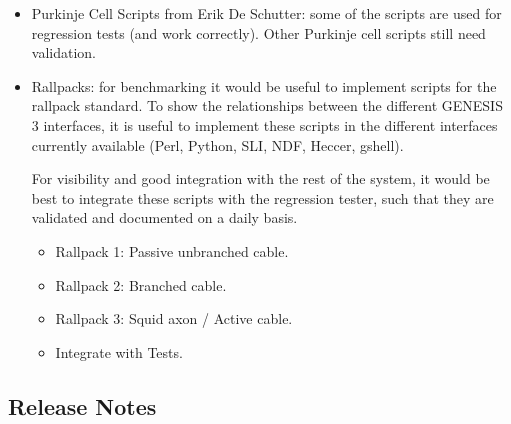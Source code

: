 \documentclass[12pt]{article}
\begin{document}
\begin{itemize}
\item Purkinje Cell Scripts from Erik De Schutter: some of the scripts
  are used for regression tests (and work correctly).  Other Purkinje
  cell scripts still need validation.
\item Rallpacks: for benchmarking it would be useful to implement
  scripts for the rallpack standard.  To show the relationships
  between the different GENESIS 3 interfaces, it is useful to
  implement these scripts in the different interfaces currently
  available (Perl, Python, SLI, NDF, Heccer, gshell).

  For visibility and good integration with the rest of the system, it
  would be best to integrate these scripts with the regression tester,
  such that they are validated and documented on a daily basis.
  \begin{itemize}
  \item Rallpack 1: Passive unbranched cable.
  \item Rallpack 2: Branched cable.
  \item Rallpack 3: Squid axon / Active cable.
  \item Integrate with Tests.
  \end{itemize}
\end{itemize}

\subsection{Release Notes}
\end{document}
